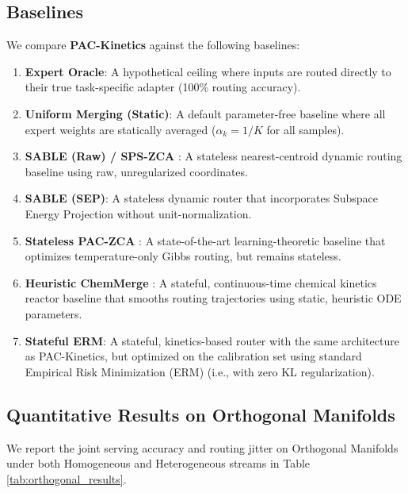 \subsection{Baselines}
\label{sec:baselines}
We compare \textbf{PAC-Kinetics} against the following baselines:
\begin{enumerate}
    \item \textbf{Expert Oracle}: A hypothetical ceiling where inputs are routed directly to their true task-specific adapter (100\% routing accuracy).
    \item \textbf{Uniform Merging (Static)}: A default parameter-free baseline where all expert weights are statically averaged ($\alpha_{k} = 1/K$ for all samples).
    \item \textbf{SABLE (Raw) / SPS-ZCA} \cite{sable_2024, zhang24spszca}: A stateless nearest-centroid dynamic routing baseline using raw, unregularized coordinates.
    \item \textbf{SABLE (SEP)}: A stateless dynamic router that incorporates Subspace Energy Projection without unit-normalization.
    \item \textbf{Stateless PAC-ZCA} \cite{pac_zca_2026}: A state-of-the-art learning-theoretic baseline that optimizes temperature-only Gibbs routing, but remains stateless.
    \item \textbf{Heuristic ChemMerge} \cite{chemmerge_2026}: A stateful, continuous-time chemical kinetics reactor baseline that smooths routing trajectories using static, heuristic ODE parameters.
    \item \textbf{Stateful ERM}: A stateful, kinetics-based router with the same architecture as PAC-Kinetics, but optimized on the calibration set using standard Empirical Risk Minimization (ERM) (i.e., with zero KL regularization).
\end{enumerate}

\subsection{Quantitative Results on Orthogonal Manifolds}
\label{sec:orthogonal_results}

We report the joint serving accuracy and routing jitter on Orthogonal Manifolds under both Homogeneous and Heterogeneous streams in Table \ref{tab:orthogonal_results}.

